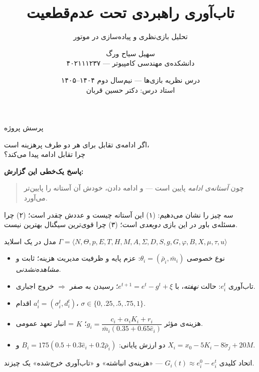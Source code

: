 \documentclass[12pt,aspectratio=169]{beamer}
\title{تاب‌آوری راهبردی تحت عدم‌قطعیت}
\subtitle{تحلیل بازی‌نظری و پیاده‌سازی در موتور \lr{SEE}}
\date{درس نظریه بازی‌ها --- نیم‌سال دوم ۱۴۰۴--۱۴۰۵\\[2pt]
\footnotesize استاد درس: دکتر حسین قربان}
\author{سهیل سیاح ورگ\\[2pt]\small ۴۰۲۱۱۱۲۳۷ --- دانشکده‌ی مهندسی کامپیوتر}
\newcommand{\sig}{\sigma}
\newcommand{\ehat}{\hat{e}}
\newcommand{\rbar}{\bar{\rho}}
\newcommand{\mbar}{\bar{m}}
\begin{document}
\begin{frame}\titlepage\end{frame}

\begin{frame}{پرسش پروژه}
\begin{block}{}
\centering\large
اگر ادامه‌ی تقابل برای هر دو طرف پرهزینه است،\\ چرا تقابل ادامه پیدا می‌کند؟
\end{block}
\vfill
\textbf{پاسخ یک‌خطی این گزارش:}
\begin{quote}
چون \emph{آستانه‌ی ادامه} پایین است — و ادامه دادن، خودش آن آستانه را
پایین‌تر می‌آورد.
\end{quote}
\vfill
\small
سه چیز را نشان می‌دهیم: (۱) این آستانه چیست و عددش چقدر است؛ (۲) چرا مسئله‌ی
باور در این بازی \emph{دوبعدی} است؛ (۳) چرا قوی‌ترین سیگنال بهترین نیست.
\end{frame}

\begin{frame}{مدل در یک اسلاید}
\small
$\Gamma=\langle N,\Theta,p,E,T,H,M,A,\Sigma,D,S,g,G,\varphi,B,X,\mu,\tau,u\rangle$
\begin{itemize}\itemsep2pt
  \item نوع خصوصی $\theta_i=(\rbar_i,\mbar_i)$: عزم پایه و ظرفیت مدیریت
        هزینه؛ ثابت و \emph{مشاهده‌نشدنی}.
  \item تاب‌آوری $e_i^t$: حالت \emph{نهفته}، با
        $e^{t+1}=e^t-g^t+\xi$؛ رسیدن به صفر $\Rightarrow$ خروج اجباری.
  \item اقدام $a_i^t=(\sig_i^t,d_i^t)$، $\sig\in\{0,.25,.5,.75,1\}$.
  \item هزینه‌ی مؤثر
        $g_i=\dfrac{c_i+\alpha_i K_i+r_i}{\mbar_i(0.35+0.65\ehat_i)}$؛
        $K$ = انبار تعهد عمومی.
  \item دو ارزش پایانی:
        $B_i=175(0.5+0.3\ehat_i+0.2\rbar_i)$ و
        $X_i=x_0-5K_i-8\tilde\sig_j+20M$.
\end{itemize}
\vfill
\begin{alertblock}{اتحاد کلیدی}
$G_i(t)\approx e_i^0-e_i^t$ — «هزینه‌ی انباشته» و «تاب‌آوری خرج‌شده» یک چیزند.
\end{alertblock}
\end{frame}
\end{document}
